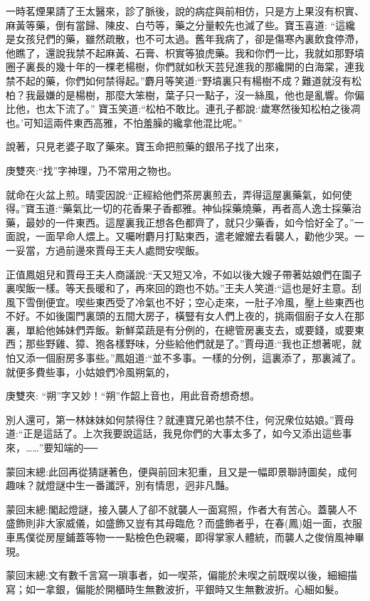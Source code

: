 \begin{parag}
    一時茗煙果請了王太醫來，診了脈後，說的病症與前相仿，只是方上果沒有枳實、麻黃等藥，倒有當歸、陳皮、白芍等，藥之分量較先也減了些。寶玉喜道: “這纔是女孩兒們的藥，雖然疏散，也不可太過。舊年我病了，卻是傷寒內裏飲食停滯，他瞧了，還說我禁不起麻黃、石膏、枳實等狼虎藥。我和你們一比，我就如那野墳圈子裏長的幾十年的一棵老楊樹，你們就如秋天芸兒進我的那纔開的白海棠，連我禁不起的藥，你們如何禁得起。”麝月等笑道:“野墳裏只有楊樹不成？難道就沒有松柏？我最嫌的是楊樹，那麼大笨樹，葉子只一點子，沒一絲風，他也是亂響。你偏比他，也太下流了。” 寶玉笑道:“松柏不敢比。連孔子都說:‘歲寒然後知松柏之後凋也。’可知這兩件東西高雅，不怕羞臊的纔拿他混比呢。”
\end{parag}


\begin{parag}
    說著，只見老婆子取了藥來。寶玉命把煎藥的銀吊子找了出來，\begin{note}庚雙夾:“找”字神理，乃不常用之物也。\end{note}就命在火盆上煎。晴雯因說:“正經給他們茶房裏煎去，弄得這屋裏藥氣，如何使得。”寶玉道:“藥氣比一切的花香果子香都雅。神仙採藥燒藥，再者高人逸士採藥治藥，最妙的一件東西。這屋裏我正想各色都齊了，就只少藥香，如今恰好全了。”一面說，一面早命人煨上。又囑咐麝月打點東西，遣老嬤嬤去看襲人，勸他少哭。一一妥當，方過前邊來賈母王夫人處問安喫飯。
\end{parag}


\begin{parag}
    正值鳳姐兒和賈母王夫人商議說:“天又短又冷，不如以後大嫂子帶著姑娘們在園子裏喫飯一樣。等天長暖和了，再來回的跑也不妨。”王夫人笑道:“這也是好主意。刮風下雪倒便宜。喫些東西受了冷氣也不好；空心走來，一肚子冷風，壓上些東西也不好。不如後園門裏頭的五間大房子，橫豎有女人們上夜的，挑兩個廚子女人在那裏，單給他姊妹們弄飯。新鮮菜蔬是有分例的，在總管房裏支去，或要錢，或要東西；那些野雞、獐、狍各樣野味，分些給他們就是了。”賈母道:“我也正想著呢，就怕又添一個廚房多事些。”鳳姐道:“並不多事。一樣的分例，這裏添了，那裏減了。就便多費些事，小姑娘們冷風朔氣的，\begin{note}庚雙夾: “朔”字又妙！“朔”作韶上音也，用此音奇想奇想。\end{note}別人還可，第一林妹妹如何禁得住？就連寶兄弟也禁不住，何況衆位姑娘。”賈母道:“正是這話了。上次我要說這話，我見你們的大事太多了，如今又添出這些事來，……”要知端的──
\end{parag}


\begin{parag}
    \begin{note}蒙回末總:此回再從猜謎著色，便與前回末犯重，且又是一幅即景聯詩圖矣，成何趣味？就燈謎中生一番讖評，別有情思，迥非凡豔。\end{note}
\end{parag}


\begin{parag}
    \begin{note}蒙回末總:閣起燈謎，接入襲人了卻不就襲人一面寫照，作者大有苦心。蓋襲人不盛飾則非大家威儀，如盛飾又豈有其母臨危？而盛飾者乎，在春(鳳)姐一面，衣服車馬僕從房屋鋪蓋等物一一點檢色色親囑，即得掌家人體統，而襲人之俊俏風神畢現。\end{note}
\end{parag}


\begin{parag}
    \begin{note}蒙回末總:文有數千言寫一瑣事者，如一喫茶，偏能於未喫之前既喫以後，細細描寫；如一拿銀，偏能於開櫃時生無數波折，平銀時又生無數波折。心細如髮。\end{note}
\end{parag}
